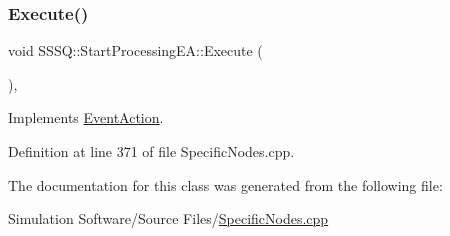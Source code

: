 \subsubsection{\texorpdfstring{Execute()}{Execute()}}
{\footnotesize\ttfamily void S\+S\+S\+Q\+::\+Start\+Processing\+E\+A\+::\+Execute (\begin{DoxyParamCaption}{ }\end{DoxyParamCaption})\hspace{0.3cm}{\ttfamily [inline]}, {\ttfamily [virtual]}}



Implements \hyperlink{class_event_action_a62b9d07abb4ca8e7c078b076a1ab1a9f}{Event\+Action}.



Definition at line 371 of file Specific\+Nodes.\+cpp.



The documentation for this class was generated from the following file\+:\begin{DoxyCompactItemize}
\item 
Simulation Software/\+Source Files/\hyperlink{_specific_nodes_8cpp}{Specific\+Nodes.\+cpp}\end{DoxyCompactItemize}
